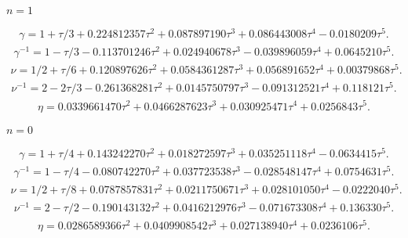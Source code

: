 \documentclass[aps,prb,preprint,showpacs,preprintnumbers,amsmath,amssymb]{revtex4}
\begin{document}
\begin{center}
\textbf{$n = 1$}
\end{center}
\begin{eqnarray}
\gamma = 1 + \tau/3 + 0.224812357 \tau^{2}
+ 0.087897190 \tau^{3}+0.086443008\tau^{4}-0.0180209 \tau^{5}.
\end{eqnarray}
\begin{eqnarray}
\gamma^{-1} = 1 - \tau/3 - 0.113701246 \tau^2
+ 0.024940678 \tau^3-0.039896059 \tau^4+0.0645210 \tau^5.
\end{eqnarray}
\begin{eqnarray}
\nu = 1/2 + \tau/6 + 0.120897626 \tau^{2}
+ 0.0584361287 \tau^{3} + 0.056891652 \tau^{4} + 0.00379868 \tau^{5}.
\end{eqnarray}
\begin{eqnarray}
\nu^{-1} = 2 - 2\tau/3 - 0.261368281 \tau^{2}
+ 0.0145750797 \tau^{3} - 0.091312521 \tau^{4} + 0.118121 \tau^{5}.
\end{eqnarray}
\begin{eqnarray}
\eta = 0.0339661470 {\tau}^{2}+0.0466287623 {\tau}^{3}
+ 0.030925471 {\tau}^{4}+0.0256843 {\tau}^{5}.
\end{eqnarray}

\begin{center}
\textbf{$n = 0$}
\end{center}
\begin{eqnarray}
\gamma = 1 + \tau/4 + 0.143242270 \tau^{2} + 0.018272597 \tau^{3}
+ 0.035251118 \tau^{4}-0.0634415\tau^{5}.
\end{eqnarray}
\begin{eqnarray}
\gamma^{-1} = 1- \tau/4 - 0.080742270\tau^{2}+0.037723538 \tau^{3}
- 0.028548147 \tau^{4}+0.0754631 \tau^{5}.
\end{eqnarray}
\begin{eqnarray}
\nu = 1/2 + \tau/8 + 0.0787857831 \tau^{2}
+ 0.0211750671 \tau^{3} + 0.028101050 \tau^{4} - 0.0222040 \tau^{5}.
\end{eqnarray}
\begin{eqnarray}
\nu^{-1} = 2 - \tau/2 - 0.190143132 \tau^{2}
+ 0.0416212976 \tau^{3} - 0.071673308 \tau^{4} + 0.136330 \tau^{5}.
\end{eqnarray}
\begin{eqnarray}
\eta = 0.0286589366 {\tau}^{2} + 0.0409908542 {\tau}^{3}
+ 0.027138940 {\tau}^{4} + 0.0236106 {\tau}^{5}.
\end{eqnarray}
\end{document}
